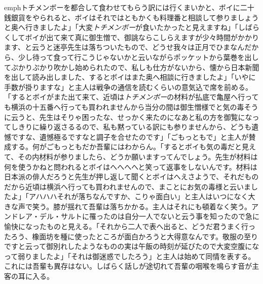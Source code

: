 \documentclass[12pt, openright]{book}
\begin{document}
emph{トチメンボー}を都合して食わせてもらう訳には行くまいかと、ボイに二十銭銀貨をやられると、ボイはそれではともかくも料理番と相談して参りましょうと奥へ行きましたよ」「大変\emph{トチメンボー}が食いたかったと見えますね」「しばらくしてボイが出て来て真に御生憎で、御誂ならこしらえますが少々時間がかかります、と云うと迷亭先生は落ちついたもので、どうせ我々は正月でひまなんだから、少し待って食って行こうじゃないかと云いながらポッケットから葉巻を出してぷかりぷかり吹かし始められたので、私しも仕方がないから、懐から日本新聞を出して読み出しました、するとボイはまた奥へ相談に行きましたよ」「いやに手数が掛りますな」と主人は戦争の通信を読むくらいの意気込で席を前める。「するとボイがまた出て来て、近頃は\emph{トチメンボー}の材料が払底で亀屋へ行っても横浜の十五番へ行っても買われませんから当分の間は御生憎様でと気の毒そうに云うと、先生はそりゃ困ったな、せっかく来たのになあと私の方を御覧になってしきりに繰り返さるるので、私も黙っている訳にも参りませんから、どうも遺憾ですな、遺憾極るですなと調子を合せたのです」「ごもっともで」と主人が賛成する。何がごもっともだか吾輩にはわからん。「するとボイも気の毒だと見えて、その内材料が参りましたら、どうか願いますってんでしょう。先生が材料は何を使うかねと問われるとボイはへへへへと笑って返事をしないんです。材料は日本派の俳人だろうと先生が押し返して聞くとボイはへえさようで、それだものだから近頃は横浜へ行っても買われませんので、まことにお気の毒様と云いましたよ」「アハハハそれが落ちなんですか、こりゃ面白い」と主人はいつになく大きな声で笑う。膝が揺れて吾輩は落ちかかる。主人はそれにも頓着なく笑う。アンドレア・デル・サルトに罹ったのは自分一人でないと云う事を知ったので急に愉快になったものと見える。「それから二人で表へ出ると、どうだ君うまく行ったろう、橡面坊を種に使ったところが面白かろうと大得意なんです。敬服の至りですと云って御別れしたようなものの実は午飯の時刻が延びたので大変空腹になって弱りましたよ」「それは御迷惑でしたろう」と主人は始めて同情を表する。これには吾輩も異存はない。しばらく話しが途切れて吾輩の咽喉を鳴らす音が主客の耳に入る。
\end{document}
